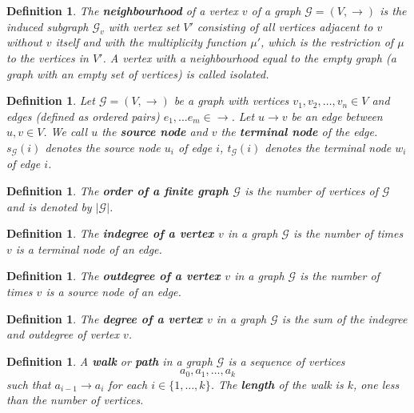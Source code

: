 \documentclass[a4paper,11pt]{report}
\newtheorem{definition}[theorem]{Definition}
\newcommand{\graf}{\mathscr{G}}
\begin{document}
 \begin{definition}
  The \textbf{neighbourhood} of a vertex $v$ of a graph $\graf=(V,\to)$ is the induced subgraph $\graf_v$ 
 with vertex set $V'$ consisting of all vertices adjacent to $v$ without $v$ itself and with the multiplicity function $\mu'$,
 which is the restriction of $\mu$ to the vertices in $V'$.
 A vertex with a neighbourhood equal to the empty graph (a graph with an empty set of vertices) is called 
 \emph{isolated}.
\end{definition}  
  

 \begin{definition}\label{terminal}
  Let $\graf=(V,\to)$ be a graph with vertices $v_1, v_2, \ldots, v_n \in V$ 
  and edges (defined as ordered pairs) $e_1, \ldots e_m  \in \to$. Let $u \to v$ be an edge between $u, v \in V$. 
  We call $u$ the \textbf{source node} and $v$ the \textbf{terminal node} of the 
  edge. $s_\graf(i)$ denotes the source node $u_i$ of edge $i$, $t_\graf(i)$ denotes the 
  terminal node $w_i$ of edge $i$.
\end{definition}
 
\begin{definition}
  The \textbf{order of a finite graph $\graf$} is the number of vertices of $\graf$ and is denoted by $|\graf|$.  
\end{definition} 
  
  \begin{definition}
    The \textbf{indegree of a vertex $v$} in a graph $\graf$ is the number of times $v$ is a terminal node of an edge. 
    
  \end{definition}
    \begin{definition}
    The \textbf{outdegree of a vertex $v$} in a graph $\graf$ is the number of times $v$ is a source node of an edge. 
    
  \end{definition}
      \begin{definition}
    The \textbf{degree of a vertex $v$} in a graph $\graf$ is the sum of the indegree and outdegree of vertex $v$. 
    
  \end{definition}
  
  
 
 \begin{definition}
   A  \textbf{walk} or \textbf{path} in a graph $\graf$ is a sequence of vertices
   $$a_0,a_1,\ldots,a_k$$
   such that $a_{i-1} \to a_i$ for each $i \in \{1,\ldots,k\}$. The \textbf{length} of the walk is $k$, one less
   than the number of vertices. 
 \end{definition}
 
\end{document}
